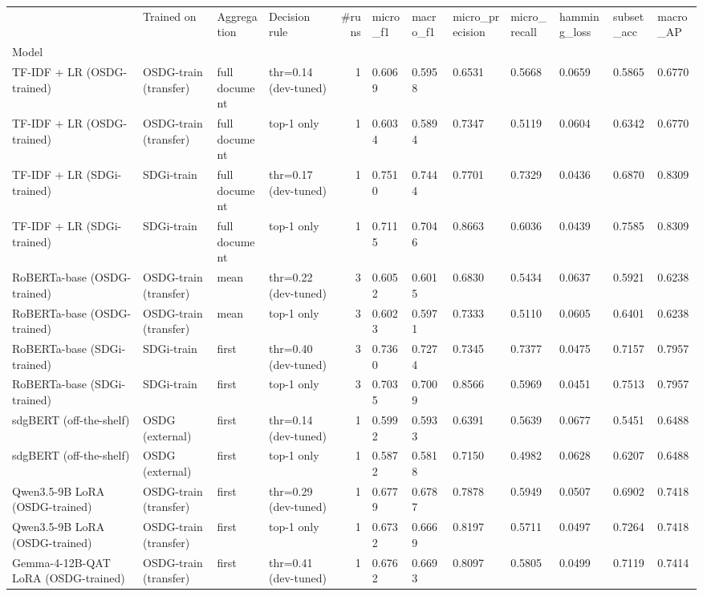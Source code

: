 \begin{tabular}{llllrlllllll}
\toprule
 & Trained on & Aggregation & Decision rule & #runs & micro_f1 & macro_f1 & micro_precision & micro_recall & hamming_loss & subset_acc & macro_AP \\
Model &  &  &  &  &  &  &  &  &  &  &  \\
\midrule
TF-IDF + LR (OSDG-trained) & OSDG-train (transfer) & full document & thr=0.14 (dev-tuned) & 1 & 0.6069 & 0.5958 & 0.6531 & 0.5668 & 0.0659 & 0.5865 & 0.6770 \\
TF-IDF + LR (OSDG-trained) & OSDG-train (transfer) & full document & top-1 only & 1 & 0.6034 & 0.5894 & 0.7347 & 0.5119 & 0.0604 & 0.6342 & 0.6770 \\
TF-IDF + LR (SDGi-trained) & SDGi-train & full document & thr=0.17 (dev-tuned) & 1 & 0.7510 & 0.7444 & 0.7701 & 0.7329 & 0.0436 & 0.6870 & 0.8309 \\
TF-IDF + LR (SDGi-trained) & SDGi-train & full document & top-1 only & 1 & 0.7115 & 0.7046 & 0.8663 & 0.6036 & 0.0439 & 0.7585 & 0.8309 \\
RoBERTa-base (OSDG-trained) & OSDG-train (transfer) & mean & thr=0.22 (dev-tuned) & 3 & 0.6052 & 0.6015 & 0.6830 & 0.5434 & 0.0637 & 0.5921 & 0.6238 \\
RoBERTa-base (OSDG-trained) & OSDG-train (transfer) & mean & top-1 only & 3 & 0.6023 & 0.5971 & 0.7333 & 0.5110 & 0.0605 & 0.6401 & 0.6238 \\
RoBERTa-base (SDGi-trained) & SDGi-train & first & thr=0.40 (dev-tuned) & 3 & 0.7360 & 0.7274 & 0.7345 & 0.7377 & 0.0475 & 0.7157 & 0.7957 \\
RoBERTa-base (SDGi-trained) & SDGi-train & first & top-1 only & 3 & 0.7035 & 0.7009 & 0.8566 & 0.5969 & 0.0451 & 0.7513 & 0.7957 \\
sdgBERT (off-the-shelf) & OSDG (external) & first & thr=0.14 (dev-tuned) & 1 & 0.5992 & 0.5933 & 0.6391 & 0.5639 & 0.0677 & 0.5451 & 0.6488 \\
sdgBERT (off-the-shelf) & OSDG (external) & first & top-1 only & 1 & 0.5872 & 0.5818 & 0.7150 & 0.4982 & 0.0628 & 0.6207 & 0.6488 \\
Qwen3.5-9B LoRA (OSDG-trained) & OSDG-train (transfer) & first & thr=0.29 (dev-tuned) & 1 & 0.6779 & 0.6787 & 0.7878 & 0.5949 & 0.0507 & 0.6902 & 0.7418 \\
Qwen3.5-9B LoRA (OSDG-trained) & OSDG-train (transfer) & first & top-1 only & 1 & 0.6732 & 0.6669 & 0.8197 & 0.5711 & 0.0497 & 0.7264 & 0.7418 \\
Gemma-4-12B-QAT LoRA (OSDG-trained) & OSDG-train (transfer) & first & thr=0.41 (dev-tuned) & 1 & 0.6762 & 0.6693 & 0.8097 & 0.5805 & 0.0499 & 0.7119 & 0.7414 \\

\end{tabular}
